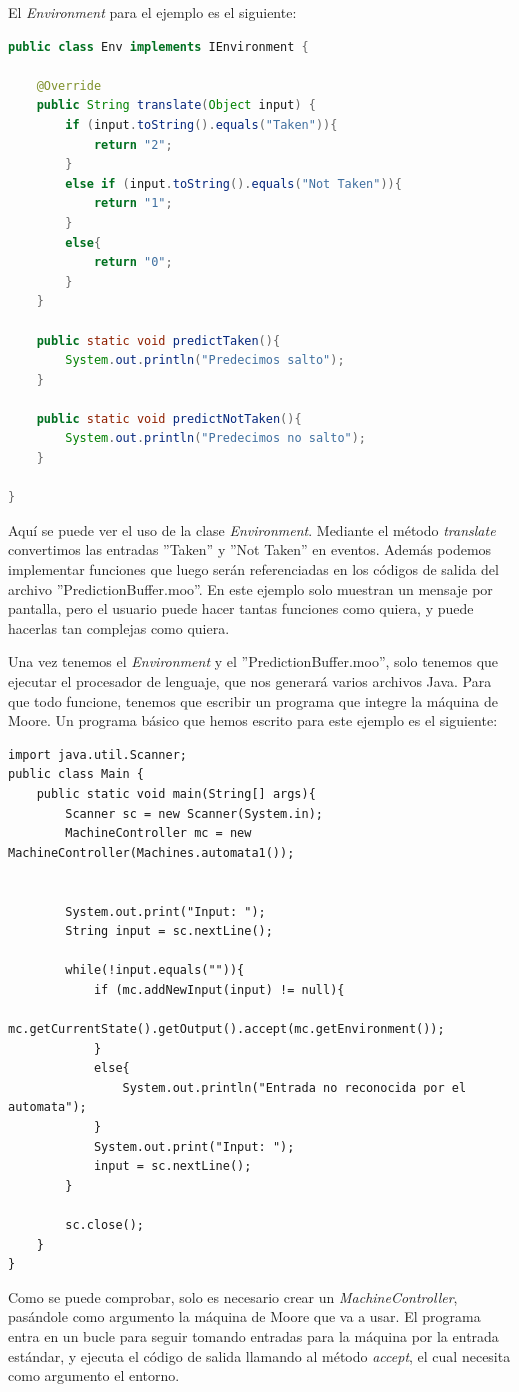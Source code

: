 \documentclass{pre-tfg}
\begin{document}
El \textit{Environment} para el ejemplo es el siguiente:

\begin{lstlisting}[caption= Environment para el autómata anterior., language=Java]
public class Env implements IEnvironment {

	@Override
	public String translate(Object input) {
        if (input.toString().equals("Taken")){
            return "2";
        }
        else if (input.toString().equals("Not Taken")){
            return "1";
        }
        else{
            return "0";
        }
	}
    
    public static void predictTaken(){
        System.out.println("Predecimos salto");
    }
    
    public static void predictNotTaken(){
        System.out.println("Predecimos no salto");
    }

}
\end{lstlisting}

Aquí se puede ver el uso de la clase \textit{Environment}. Mediante el método \textit{translate} convertimos las entradas ''Taken'' y ''Not Taken'' en eventos. Además podemos implementar funciones que luego serán referenciadas en los códigos de salida del archivo ''PredictionBuffer.moo''. En este ejemplo solo muestran un mensaje por pantalla, pero el usuario puede hacer tantas funciones como quiera, y puede hacerlas tan complejas como quiera.


Una vez tenemos el \textit{Environment} y el ''PredictionBuffer.moo'', solo tenemos que ejecutar el procesador de lenguaje, que nos generará varios archivos Java. Para que todo funcione, tenemos que escribir un programa que integre la máquina de Moore. Un programa básico que hemos escrito para este ejemplo es el siguiente:
\begin{lstlisting}[caption= Main para el autómata anterior.]
import java.util.Scanner;
public class Main {
    public static void main(String[] args){
        Scanner sc = new Scanner(System.in);
        MachineController mc = new MachineController(Machines.automata1());


        System.out.print("Input: ");
        String input = sc.nextLine();

        while(!input.equals("")){
            if (mc.addNewInput(input) != null){
                mc.getCurrentState().getOutput().accept(mc.getEnvironment());
            }
            else{
                System.out.println("Entrada no reconocida por el automata");
            }
            System.out.print("Input: ");
            input = sc.nextLine();
        }

        sc.close();
    }
}
\end{lstlisting}
Como se puede comprobar, solo es necesario crear un \textit{MachineController}, pasándole como argumento la máquina de Moore que va a usar. El programa entra en un bucle para seguir tomando entradas para la máquina por la entrada estándar, y ejecuta el código de salida llamando al método \textit{accept}, el cual necesita como argumento el entorno.
\end{document}
